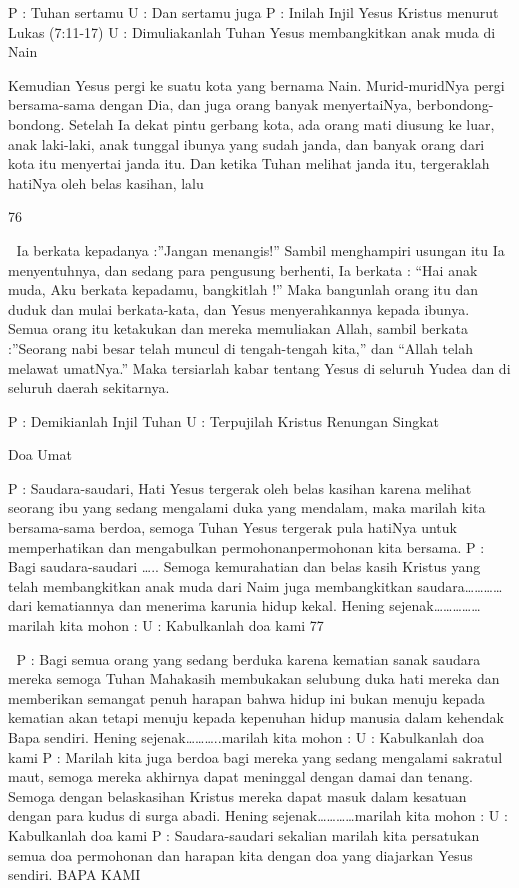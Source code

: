 \documentclass[10pt,a5paper,fancyhdr]{memoir}
\begin{document}
P : Tuhan sertamu 
U : Dan sertamu juga 
P : Inilah Injil Yesus Kristus menurut Lukas (7:11-17) 
U : Dimuliakanlah Tuhan 
Yesus membangkitkan anak muda di Nain 

Kemudian Yesus pergi ke suatu kota yang bernama Nain. 
Murid-muridNya pergi bersama-sama dengan Dia, dan juga 
orang banyak menyertaiNya, berbondong-bondong. Setelah Ia 
dekat pintu gerbang kota, ada orang mati diusung ke luar, anak 
laki-laki, anak tunggal ibunya yang sudah janda, dan banyak 
orang dari kota itu menyertai janda itu. Dan ketika Tuhan 
melihat janda itu, tergeraklah hatiNya oleh belas kasihan, lalu 

76 



Ia berkata kepadanya :”Jangan menangis!” Sambil 
menghampiri usungan itu Ia menyentuhnya, dan sedang para 
pengusung berhenti, Ia berkata : “Hai anak muda, Aku berkata 
kepadamu, bangkitlah !” Maka bangunlah orang itu dan duduk 
dan mulai berkata-kata, dan Yesus menyerahkannya kepada 
ibunya. Semua orang itu ketakukan dan mereka memuliakan 
Allah, sambil berkata :”Seorang nabi besar telah muncul di 
tengah-tengah kita,” dan “Allah telah melawat umatNya.” 
Maka tersiarlah kabar tentang Yesus di seluruh Yudea dan di 
seluruh daerah sekitarnya. 

P : Demikianlah Injil Tuhan 
U : Terpujilah Kristus 
Renungan Singkat 

Doa Umat 

P 
: Saudara-saudari, 
Hati Yesus tergerak oleh belas kasihan karena melihat 
seorang ibu yang sedang mengalami duka yang 
mendalam, maka marilah kita bersama-sama berdoa, 
semoga Tuhan Yesus tergerak pula hatiNya untuk 
memperhatikan dan mengabulkan permohonanpermohonan 
kita bersama. 
P 
: Bagi saudara-saudari ….. 
Semoga kemurahatian dan belas kasih Kristus yang telah 
membangkitkan anak muda dari Naim juga 
membangkitkan saudara…………dari kematiannya dan 
menerima karunia hidup kekal. 
Hening sejenak……………marilah kita mohon : 
U : Kabulkanlah doa kami 
77 



P 
: Bagi semua orang yang sedang berduka karena kematian 
sanak saudara mereka semoga Tuhan Mahakasih 
membukakan selubung duka hati mereka dan memberikan 
semangat penuh harapan bahwa hidup ini bukan menuju 
kepada kematian akan tetapi menuju kepada kepenuhan 
hidup manusia dalam kehendak Bapa sendiri. 
Hening sejenak………..marilah kita mohon : 
U : Kabulkanlah doa kami 
P 
: Marilah kita juga berdoa bagi mereka yang sedang 
mengalami sakratul maut, semoga mereka akhirnya dapat 
meninggal dengan damai dan tenang. Semoga dengan 
belaskasihan Kristus mereka dapat masuk dalam kesatuan 
dengan para kudus di surga abadi. 
Hening sejenak…………marilah kita mohon : 
U : Kabulkanlah doa kami 
P 
: Saudara-saudari sekalian marilah kita persatukan semua 
doa permohonan dan harapan kita dengan doa yang 
diajarkan Yesus sendiri. 
BAPA KAMI 
\end{document}
